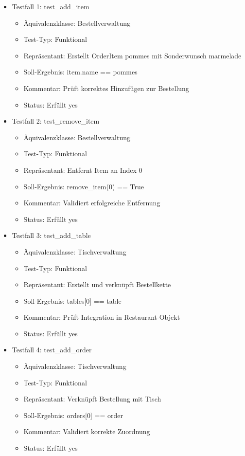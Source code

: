 \documentclass[a4paper,11pt]{article}
\begin{document}
\begin{itemize}
    \item Testfall 1: test\_add\_item
    \begin{itemize}
        \item Äquivalenzklasse: Bestellverwaltung
        \item Test-Typ: Funktional
        \item Repräsentant: Erstellt OrderItem pommes mit Sonderwunsch marmelade
        \item Soll-Ergebnis: item.name == pommes
        \item Kommentar: Prüft korrektes Hinzufügen zur Bestellung
        \item Status: Erfüllt yes
    \end{itemize}
    \item Testfall 2: test\_remove\_item
    \begin{itemize}
        \item Äquivalenzklasse: Bestellverwaltung
        \item Test-Typ: Funktional
        \item Repräsentant: Entfernt Item an Index 0
        \item Soll-Ergebnis: remove\_item(0) == True
        \item Kommentar: Validiert erfolgreiche Entfernung
        \item Status: Erfüllt yes
    \end{itemize}
    \item Testfall 3: test\_add\_table
    \begin{itemize}
        \item Äquivalenzklasse: Tischverwaltung
        \item Test-Typ: Funktional
        \item Repräsentant: Erstellt und verknüpft Bestellkette
        \item Soll-Ergebnis: tables[0] == table
        \item Kommentar: Prüft Integration in Restaurant-Objekt
        \item Status: Erfüllt yes
    \end{itemize}
  \item Testfall 4: test\_add\_order
    \begin{itemize}
        \item Äquivalenzklasse: Tischverwaltung
        \item Test-Typ: Funktional
        \item Repräsentant: Verknüpft Bestellung mit Tisch
        \item Soll-Ergebnis: orders[0] == order
        \item Kommentar: Validiert korrekte Zuordnung
        \item Status: Erfüllt yes
    \end{itemize}
\end{itemize}
\end{document}
